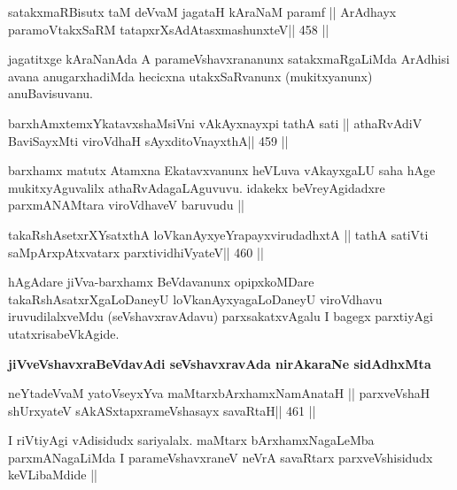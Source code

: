 \begin{shl}
satakxmaRBisutx taM deVvaM jagataH kAraNaM paramf ||
ArAdhayx paramoVtakxSaRM tatapxrXsAdAtasxmashunxteV\hfill || 458 ||
\end{shl}

\begin{artha}
jagatitxge kAraNanAda A parameVshavxrananunx satakxmaRgaLiMda ArAdhisi
avana anugarxhadiMda hecicxna utakxSaRvanunx (mukitxyanunx) anuBavisuvanu.
\end{artha}


\begin{shl}
barxhAmxtemxYkatavxshaMsiVni vAkAyxnayxpi tathA sati ||
athaRvAdiV BaviSayxMti viroVdhaH sAyxditoV\s nayxthA\hfill || 459 ||
\end{shl}

\begin{artha}
barxhamx matutx Atamxna Ekatavxvanunx heVLuva vAkayxgaLU saha hAge
mukitxyAguvalilx athaRvAdagaLAguvuvu. idakekx beVreyAgidadxre
parxmANAMtara viroVdhaveV baruvudu ||
\end{artha}

\begin{shl}
takaRshAsetxrXYsatxthA loVkanAyxyeYrapayxvirudadhxtA ||
tathA satiVti saMpArxpAtxvatarx parxtividhiVyateV\hfill || 460 ||
\end{shl}


\begin{artha}
hAgAdare jiVva-barxhamx BeVdavanunx opipxkoMDare
takaRshAsatxrXgaLoDaneyU 
loVkanAyxyagaLoDaneyU viroVdhavu iruvudilalxveMdu (seVshavxravAdavu)
parxsakatxvAgalu I bagegx parxtiyAgi utatxrisabeVkAgide.
\end{artha}

\medskip
\centerline{\textbf{jiVveVshavxraBeVdavAdi seVshavxravAda nirAkaraNe
    sidAdhxMta}}
\medskip

\begin{shl}
neYtadeVvaM yatoV\s seyxYva maMtarxbArxhamxNamAnataH ||
parxveVshaH shUrxyateV sAkASxtapxrameVshasayx savaRtaH\hfill || 461 ||
\end{shl}

\begin{artha}
I riVtiyAgi vAdisidudx sariyalalx. maMtarx bArxhamxNagaLeMba
parxmANagaLiMda I parameVshavxraneV neVrA savaRtarx parxveVshisidudx
keVLibaMdide ||
\end{artha}

